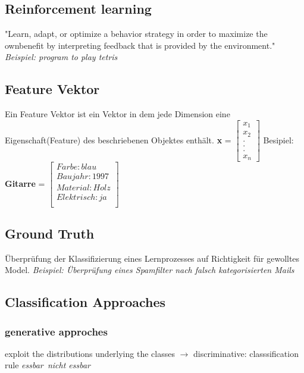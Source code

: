 \documentclass[11pt,a4paper]{article}
\begin{document}
\begin{flushleft}
\subsection{Reinforcement learning}
    "Learn, adapt, or optimize a behavior strategy in order to maximize the ownbenefit by interpreting feedback that is provided by the environment."
    \textit{Beispiel: program to play tetris}

\subsection{Feature Vektor}
    Ein Feature Vektor ist ein Vektor in dem jede Dimension eine Eigenschaft(Feature) des beschriebenen Objektes enthält.\newline
    \textbf{x} =
    $\begin{bmatrix}
    x_1\\
    x_2\\
    .\\
    .\\
    .\\
    x_n
    \end{bmatrix}$
    \quad Besipiel: \textbf{Gitarre} = 
    $\begin{bmatrix}
    Farbe: blau\\
    Baujahr: 1997\\
    Material: Holz\\
    Elektrisch: ja\\
    \end{bmatrix}$


\subsection{Ground Truth}
Überprüfung der Klassifizierung eines Lernprozesses auf Richtigkeit für gewolltes Model.\newline
\textit{Beispiel: Überprüfung eines Spamfilter nach falsch kategorisierten Mails}

\subsection{Classification Approaches}
\subsubsection{generative approches}
exploit the distributions underlying the classes $\rightarrow$ discriminative: classsification rule \newline
\textit{essbar\ nicht essbar}

\end{flushleft}
\end{document}
